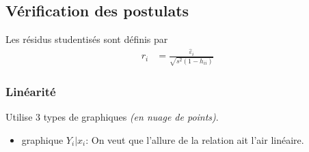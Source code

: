 \documentclass[10pt, french]{article}
\begin{document}
\begin{multicols*}{3}
\subsection*{Vérification des postulats}
%

Les résidus studentisés sont définis par
\begin{align*}
r_i &= \frac{\hat{\varepsilon}_i}{\sqrt{s^2(1 - h_{ii})}}
\end{align*}

\subsubsection*{Linéarité}
Utilise 3 types de graphiques \textit{(en nuage de points)}.
\begin{itemize}
\item graphique $Y_i | x_i$: On veut que l'allure de la relation ait l'air linéaire.


\begin{tikzpicture}[x=0.75pt,y=0.75pt,yscale=-1,xscale=1]


\end{tikzpicture}
\end{itemize}
\end{multicols*}
\end{document}

